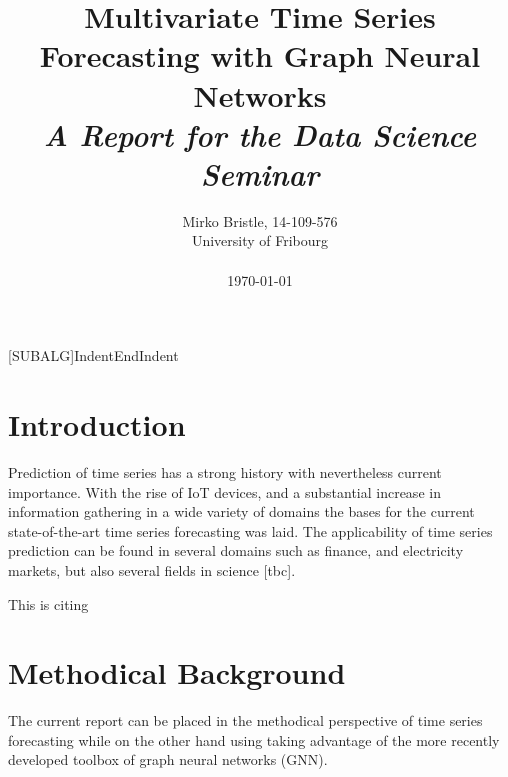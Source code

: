 \documentclass[letterpaper,twocolumn,11pt]{article}
\begin{document}
    [SUBALG]{Indent}{EndIndent}{}{\algorithmicend\ }%

    \title{\Large \bf Multivariate Time Series Forecasting with Graph Neural Networks \\
    \Medium \it A Report for the Data Science Seminar
    }

    \author{
            {\rm Mirko Bristle, 14-109-576}\\
        University of Fribourg \\
        \\
        \today
    }
    \maketitle


%


    \section{Introduction}

    Prediction of time series has a strong history with nevertheless current importance. With the rise of IoT devices, and a substantial
    increase in information gathering in a wide variety of domains the bases for the current state-of-the-art time series forecasting was laid.
    The applicability of time series prediction can be found in several domains such as finance, and electricity markets, but also several fields in science [tbc].


    This is citing \cite{wu2020connecting}


    \section{Methodical Background}
    The current report can be placed in the methodical perspective of time series forecasting while on the other hand using
    taking advantage of the more recently developed toolbox of graph neural networks (GNN).
\end{document}
